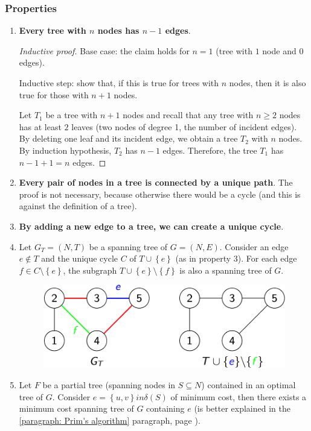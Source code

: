 \subsubsection{Properties}

\begin{enumerate}
    \item \textbf{Every tree with $n$ nodes has $n-1$ edges}.
    \begin{proof}[Inductive proof]
        Base case: the claim holds for $n=1$ (tree with $1$ node and $0$ edges).

        Inductive step: show that, if this is true for trees with $n$ nodes, then it is also true for those with $n+1$ nodes.

        Let $T_{1}$ be a tree with $n+1$ nodes and recall that any tree with $n \ge 2$ nodes has at least $2$ leaves (two nodes of degree 1, the number of incident edges). By deleting one leaf and its incident edge, we obtain a tree $T_{2}$ with $n$ nodes. By induction hypothesis, $T_{2}$ has $n-1$ edges. Therefore, the tree $T_{1}$ has $n-1+1 = n$ edges.
    \end{proof}

    \item \textbf{Every pair of nodes in a tree is connected by a unique path}. The proof is not necessary, because otherwise there would be a cycle (and this is against the definition of a tree).

    \item \textbf{By adding a new edge to a tree, we can create a unique cycle}.

    \item Let $G_{T} = \left(N,T\right)$ be a spanning tree of $G = \left(N,E\right)$. Consider an edge $e \notin T$ and the unique cycle $C$ of $T \cup \left\{e\right\}$ (as in property 3). For each edge $f \in C \setminus \left\{e\right\}$, the subgraph $T \cup \left\{e\right\} \setminus \left\{f\right\}$ is also a spanning tree of $G$.
    \begin{figure}[!htp]
        \centering
        \includegraphics[width=.5\textwidth]{img/trees-5.pdf}
    \end{figure}

    \item Let $F$ be a partial tree (spanning nodes in $S \subseteq N$) contained in an optimal tree of $G$. Consider $e = \left\{u,v\right\} in \delta\left(S\right)$ of minimum cost, then there exists a minimum cost spanning tree of $G$ containing $e$ (is better explained in the \ref{paragraph: Prim's algorithm} paragraph, page \pageref{paragraph: Prim's algorithm}).


\end{enumerate}
